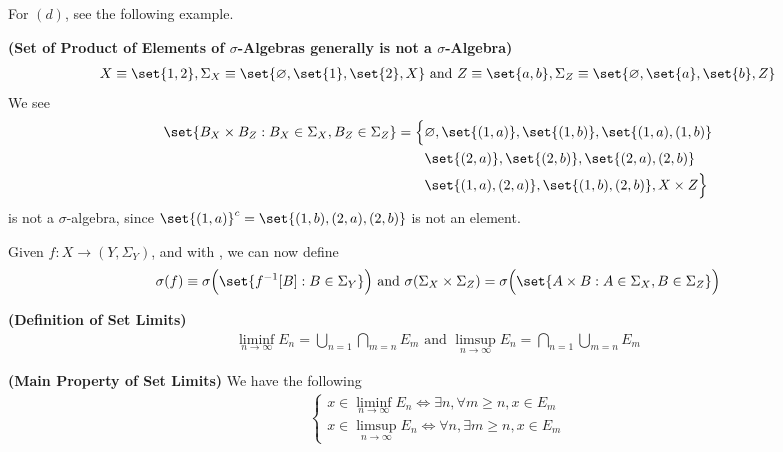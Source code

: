 \documentclass{report}
\begin{document}
\begin{mdframed}
For $(d)$, see the following example. 
\end{mdframed}
\begin{Example}{\textbf{(Set of Product of Elements of $\sigma$-Algebras generally is not a $\sigma$-Algebra)}
}{}
\begin{align*}
X\equiv \set{1,2},\Sigma_X\equiv \set{\varnothing,\set{1},\set{2},X}\text{ and }Z\equiv \set{a,b},\Sigma_Z \equiv \set{\varnothing,\set{a},\set{b},Z}
\end{align*}
We see 
\begin{align*}
  \set{B_X\times B_Z : B_X \in \Sigma_X , B_Z \in \Sigma_Z}=\Big\{&\varnothing,\set{(1,a)},\set{(1,b)},\set{(1,a),(1,b)}\\
&\set{(2,a)},\set{(2,b)},\set{(2,a),(2,b)}\\
&\set{(1,a),(2,a)},\set{(1,b),(2,b)},X\times Z\Big\}
\end{align*}
is not a $\sigma$-algebra, since $\set{(1,a)}^c=\set{(1,b),(2,a),(2,b)}$ is not an element. 
\end{Example}
\begin{mdframed}
Given $f:X\rightarrow (Y,\Sigma_Y)$, and with  , we can now define 
\begin{align*}
\sigma(f)\equiv \sigma \Big(\set{f^{-1}[B]:B \in \Sigma_Y}\Big)\text{ and }\sigma(\Sigma_X\times \Sigma_Z)=\sigma\Big(\set{A\times B:A\in \Sigma_X,B\in \Sigma_Z}\Big)
\end{align*}
\end{mdframed}
\begin{definition}
\label{0.7.5}
\textbf{(Definition of Set Limits)} 
\begin{align*}
\liminf_{n\to\infty} E_n=\bigcup_{n=1} \bigcap_{m=n} E_m \text{ and } \limsup_{n\to\infty} E_n = \bigcap_{n=1} \bigcup_{m=n} E_m
\end{align*}
\end{definition}
\begin{theorem}
\label{0.7.6}
\textbf{(Main Property of Set Limits)} We have the following 
\begin{align*}
\begin{cases}
   x \in \liminf_{n\to\infty} E_n \iff  \exists n ,\forall m\geq n, x\in E_m \\
   x \in \limsup_{n\to\infty} E_n\iff \forall n, \exists m\geq n, x \in E_m
\end{cases}
\end{align*}
\end{theorem}
\end{document}
